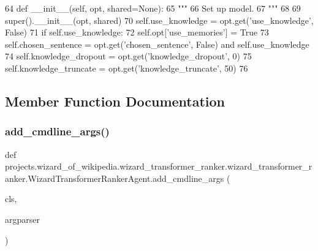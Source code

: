 \begin{DoxyCode}
64     \textcolor{keyword}{def }\_\_init\_\_(self, opt, shared=None):
65         \textcolor{stringliteral}{"""}
66 \textcolor{stringliteral}{        Set up model.}
67 \textcolor{stringliteral}{        """}
68 
69         super().\_\_init\_\_(opt, shared)
70         self.use\_knowledge = opt.get(\textcolor{stringliteral}{'use\_knowledge'}, \textcolor{keyword}{False})
71         \textcolor{keywordflow}{if} self.use\_knowledge:
72             self.opt[\textcolor{stringliteral}{'use\_memories'}] = \textcolor{keyword}{True}
73         self.chosen\_sentence = opt.get(\textcolor{stringliteral}{'chosen\_sentence'}, \textcolor{keyword}{False}) \textcolor{keywordflow}{and} self.use\_knowledge
74         self.knowledge\_dropout = opt.get(\textcolor{stringliteral}{'knowledge\_dropout'}, 0)
75         self.knowledge\_truncate = opt.get(\textcolor{stringliteral}{'knowledge\_truncate'}, 50)
76 
\end{DoxyCode}


\subsection{Member Function Documentation}
\mbox{\label{classprojects_1_1wizard__of__wikipedia_1_1wizard__transformer__ranker_1_1wizard__transformer__rad02f16524e5e0423aa3e2c69e1330ee1_a8dea037d2903975503586b5aa5c8bd36}} 
\subsubsection{\texorpdfstring{add\+\_\+cmdline\+\_\+args()}{add\_cmdline\_args()}}
{\footnotesize\ttfamily def projects.\+wizard\+\_\+of\+\_\+wikipedia.\+wizard\+\_\+transformer\+\_\+ranker.\+wizard\+\_\+transformer\+\_\+ranker.\+Wizard\+Transformer\+Ranker\+Agent.\+add\+\_\+cmdline\+\_\+args (\begin{DoxyParamCaption}\item[{}]{cls,  }\item[{}]{argparser }\end{DoxyParamCaption})}

